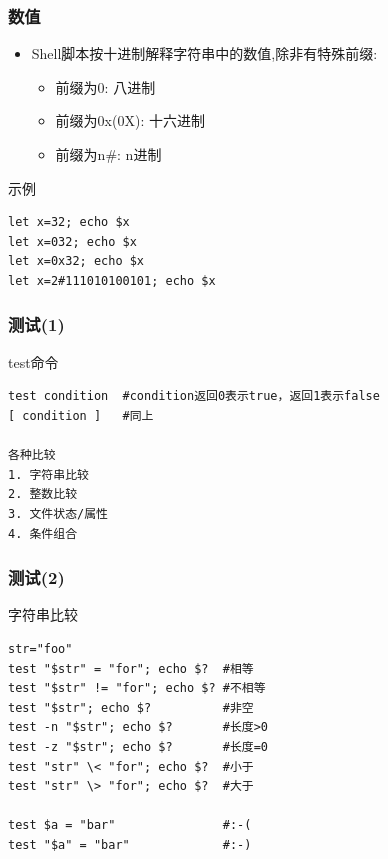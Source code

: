 \documentclass[xcolor=svgnames,presentation]{beamer}
\begin{document}
\begin{frame}[fragile]
\frametitle{数值}
\label{sec-1-2-24}
\begin{itemize}

\item Shell脚本按十进制解释字符串中的数值,除非有特殊前缀:
\label{sec-1-2-24-1}%
\begin{itemize}

\item 前缀为0: 八进制
\label{sec-1-2-24-1-1}%

\item 前缀为0x(0X): 十六进制
\label{sec-1-2-24-1-2}%

\item 前缀为n\#: n进制
\label{sec-1-2-24-1-3}%
\end{itemize} %
\end{itemize} %
\begin{exampleblock}{示例}
\label{sec-1-2-24-2}


\begin{verbatim}
let x=32; echo $x
let x=032; echo $x
let x=0x32; echo $x
let x=2#111010100101; echo $x
\end{verbatim}
\end{exampleblock}
\end{frame}
\begin{frame}[fragile]
\frametitle{测试(1)}
\label{sec-1-2-25}
\begin{exampleblock}{test命令}
\label{sec-1-2-25-1}


\begin{verbatim}
test condition  #condition返回0表示true，返回1表示false
[ condition ]   #同上

各种比较
1. 字符串比较
2. 整数比较
3. 文件状态/属性
4. 条件组合
\end{verbatim}
\end{exampleblock}
\end{frame}
\begin{frame}[fragile]
\frametitle{测试(2)}
\label{sec-1-2-26}
\begin{exampleblock}{字符串比较}
\label{sec-1-2-26-1}


\begin{verbatim}
str="foo"
test "$str" = "for"; echo $?  #相等
test "$str" != "for"; echo $? #不相等
test "$str"; echo $?          #非空
test -n "$str"; echo $?       #长度>0
test -z "$str"; echo $?       #长度=0
test "str" \< "for"; echo $?  #小于
test "str" \> "for"; echo $?  #大于

test $a = "bar"               #:-(
test "$a" = "bar"             #:-)
\end{verbatim}
\end{exampleblock}
\end{frame}
\end{document}
